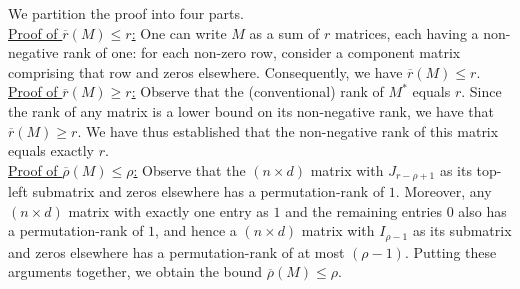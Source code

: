 \documentclass[11pt, hidelinks]{article} %
\newcommand{\upperonesmx}{J}
\newcommand{\identitymx}{I}
\newcommand{\numrows}{n}
\newcommand{\numcols}{d}
\newcommand{\wtmatrix}{M}
\newcommand{\wtstar}{\wtmatrix^*}
\newcommand{\nnrank}{r}
\newcommand{\permrank}{\rho}
\newcommand{\fnpermrank}[1]{\overline{\permrank}(#1)}
\newcommand{\fnnnrank}[1]{\overline{\nnrank}(#1)}
\begin{document}
We partition the proof into four parts.\\

\noindent \underline{Proof of $\fnnnrank{\wtmatrix} \leq \nnrank$:}
One can write $\wtmatrix$ as a sum of $\nnrank$ matrices, each having
a non-negative rank of one: for each non-zero row, consider a
component matrix comprising that row and zeros
elsewhere. Consequently, we have $\fnnnrank{\wtmatrix} \leq
\nnrank$. \\

\noindent \underline{Proof of $\fnnnrank{\wtmatrix} \geq \nnrank$:}
Observe that the
(conventional) rank of $\wtstar$ equals $\nnrank$. Since the rank of any
matrix is a lower bound on its non-negative rank, we have that
$\fnnnrank{\wtmatrix} \geq \nnrank$. We have thus established that the non-negative rank of this
matrix equals exactly $\nnrank$. \\

\noindent \underline{Proof of $\fnpermrank{\wtmatrix} \leq
  \permrank$:} Observe that the $(\numrows \times \numcols)$ matrix
with $\upperonesmx_{\nnrank - \permrank + 1}$ as its top-left
submatrix and zeros elsewhere has a permutation-rank of $1$. Moreover,
any $(\numrows \times \numcols)$ matrix with exactly one entry as $1$
and the remaining entries $0$ also has a permutation-rank of $1$, and
hence a $(\numrows \times \numcols)$ matrix with
$\identitymx_{\permrank - 1}$ as its submatrix and zeros elsewhere has
a permutation-rank of at most $(\permrank-1)$. Putting these arguments
together, we obtain the bound $\fnpermrank{\wtmatrix} \leq
\permrank$.\\
\end{document}
